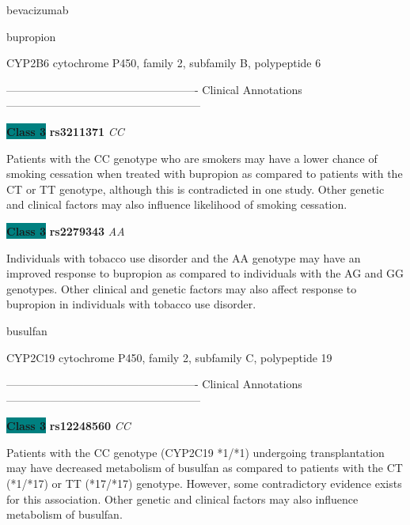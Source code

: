 \documentclass{resume} %
\begin{document}
\begin{rSection}{ bevacizumab }
\end{rSection}\begin{rSection}{ bupropion }
\item[]

\begin{rSubsection}{ CYP2B6 }{ cytochrome P450, family 2, subfamily B, polypeptide 6 }{}{}
\item[]

\item[] ---------------------------------------------------- Clinical Annotations -----------------------------------------------------\newline
\item \textbf{\colorbox{teal} {Class 3}} \textbf{ rs3211371 } \textit{ CC }
\item[] Patients with the CC genotype who are smokers may have a lower chance of smoking cessation when treated with bupropion as compared to patients with the CT or TT genotype, although this is contradicted in one study. Other genetic and clinical factors may also influence likelihood of smoking cessation.\item \textbf{\colorbox{teal} {Class 3}} \textbf{ rs2279343 } \textit{ AA }
\item[] Individuals with tobacco use disorder and the AA genotype may have an improved response to bupropion as compared to individuals with the AG and GG genotypes. Other clinical and genetic factors may also affect response to bupropion in individuals with tobacco use disorder. 
\end{rSubsection}

\end{rSection}\begin{rSection}{ busulfan }
\item[]

\begin{rSubsection}{ CYP2C19 }{ cytochrome P450, family 2, subfamily C, polypeptide 19 }{}{}
\item[]

\item[] ---------------------------------------------------- Clinical Annotations -----------------------------------------------------\newline
\item \textbf{\colorbox{teal} {Class 3}} \textbf{ rs12248560 } \textit{ CC }
\item[] Patients with the CC genotype (CYP2C19 *1/*1) undergoing transplantation may have decreased metabolism of busulfan as compared to patients with the CT (*1/*17) or TT (*17/*17) genotype. However, some contradictory evidence exists for this association. Other genetic and clinical factors may also influence metabolism of busulfan.
\end{rSubsection}


\end{rSection}
\end{document}
